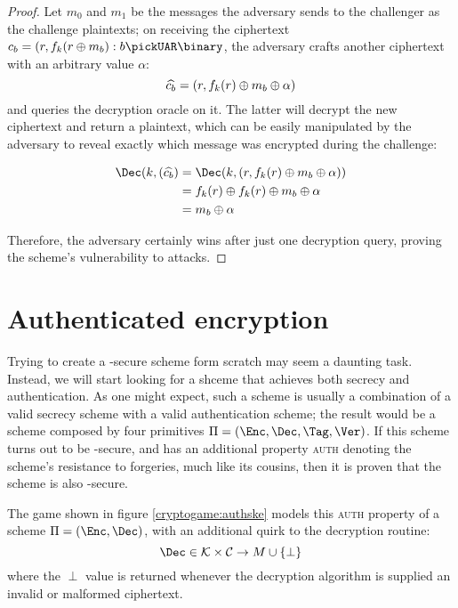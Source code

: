 \begin{proof}

    Let $m_0$ and $m_1$ be the messages the adversary sends to the challenger as the challenge plaintexts; on receiving the ciphertext $c_b = (r, f_k(r \xor m_b) : b \pickUAR \binary$, the adversary crafts another ciphertext with an arbitrary value $\alpha$:
    \[
        \widehat{c_b} = (r, f_k(r) \oplus m_b \oplus \alpha)
    \]
    and queries the decryption oracle on it. The latter will decrypt the new ciphertext and return a plaintext, which can be easily manipulated by the adversary to reveal exactly which message was encrypted during the challenge:

    \begin{align*}
        \Dec(k, (\widehat{c_b}) &= \Dec(k, (r, f_k(r) \xor m_b \xor \alpha))    \\
                                &= f_k(r) \xor f_k(r) \xor m_b \xor \alpha      \\
                                &= m_b \xor \alpha                              \\
    \end{align*}

    Therefore, the adversary certainly wins after just one decryption query, proving the scheme's vulnerability to \cca{} attacks.
   
\end{proof}

\section{Authenticated encryption}

Trying to create a \cca-secure scheme form scratch may seem a daunting task. Instead, we will start looking for a shceme that achieves both secrecy and authentication. As one might expect, such a scheme is usually a combination of a valid secrecy scheme with a valid authentication scheme; the result would be a scheme composed by four primitives $\Pi = (\Enc, \Dec, \Tag, \Ver)$. If this scheme turns out to be \cpa-secure, and has an additional property \textsc{auth} denoting the scheme's resistance to forgeries, much like its \mac{} cousins, then it is proven that the scheme is also \cca-secure.

The game shown in figure \ref{cryptogame:authske} models this \textsc{auth} property of a scheme $\Pi = (\Enc, \Dec)$, with an additional quirk to the decryption routine:
\[
    \Dec \in \K \times \C \to M \cup \{\perp\}
\]
where the $\perp$ value is returned whenever the decryption algorithm is supplied an invalid or malformed ciphertext.

